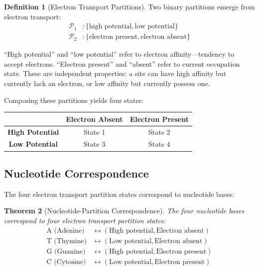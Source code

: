 \documentclass[twocolumn,10pt,a4paper]{article}
\newtheorem{theorem}{Theorem}[section]
\theoremstyle{definition}
\newtheorem{definition}[theorem]{Definition}
\theoremstyle{remark}
\newcommand{\Partition}{\mathcal{P}}
\begin{document}
\begin{definition}[Electron Transport Partitions]
\label{def:et_partition}
Two binary partitions emerge from electron transport:
\begin{align}
    \Partition_1 &: \{\text{high potential}, \text{low potential}\} \\
    \Partition_2 &: \{\text{electron present}, \text{electron absent}\}
\end{align}
\end{definition}

``High potential'' and ``low potential'' refer to electron affinity---tendency to accept electrons. ``Electron present'' and ``absent'' refer to current occupation state. These are independent properties: a site can have high affinity but currently lack an electron, or low affinity but currently possess one.

Composing these partitions yields four states:

\begin{center}
\begin{tabular}{c|cc}
\toprule
& \textbf{Electron Absent} & \textbf{Electron Present} \\
\midrule
\textbf{High Potential} & State 1 & State 2 \\
\textbf{Low Potential} & State 3 & State 4 \\
\bottomrule
\end{tabular}
\end{center}

\subsection{Nucleotide Correspondence}

The four electron transport partition states correspond to nucleotide bases:

\begin{theorem}[Nucleotide-Partition Correspondence]
\label{thm:nucleotide}
The four nucleotide bases correspond to four electron transport partition states:
\begin{align}
    \text{A (Adenine)} &\leftrightarrow (\text{High potential}, \text{Electron absent}) \\
    \text{T (Thymine)} &\leftrightarrow (\text{Low potential}, \text{Electron absent}) \\
    \text{G (Guanine)} &\leftrightarrow (\text{High potential}, \text{Electron present}) \\
    \text{C (Cytosine)} &\leftrightarrow (\text{Low potential}, \text{Electron present})
\end{align}
\end{theorem}
\end{document}
